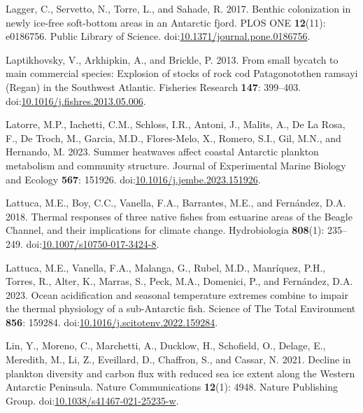 \documentclass[
]{article}
\newlength{\cslhangindent}
\newenvironment{CSLReferences}[2] %
 {\begin{list}{}{%
  \setlength{\itemindent}{0pt}
  \setlength{\leftmargin}{0pt}
  \setlength{\parsep}{0pt}
  \ifodd #1
   \setlength{\leftmargin}{\cslhangindent}
   \setlength{\itemindent}{-1\cslhangindent}
  \fi
  \setlength{\itemsep}{#2\baselineskip}}}
 {\end{list}}
\begin{document}
\begin{CSLReferences}{1}{0}
Lagger, C., Servetto, N., Torre, L., and Sahade, R. 2017. Benthic
colonization in newly ice-free soft-bottom areas in an {Antarctic}
fjord. PLOS ONE \textbf{12}(11): e0186756. Public Library of Science.
doi:\href{https://doi.org/10.1371/journal.pone.0186756}{10.1371/journal.pone.0186756}.

Laptikhovsky, V., Arkhipkin, A., and Brickle, P. 2013. From small
bycatch to main commercial species: {Explosion} of stocks of rock cod
{Patagonotothen} ramsayi ({Regan}) in the {Southwest Atlantic}.
Fisheries Research \textbf{147}: 399--403.
doi:\href{https://doi.org/10.1016/j.fishres.2013.05.006}{10.1016/j.fishres.2013.05.006}.

Latorre, M.P., Iachetti, C.M., Schloss, I.R., Antoni, J., Malits, A., De
La Rosa, F., De Troch, M., Garcia, M.D., Flores-Melo, X., Romero, S.I.,
Gil, M.N., and Hernando, M. 2023. Summer heatwaves affect coastal
{Antarctic} plankton metabolism and community structure. Journal of
Experimental Marine Biology and Ecology \textbf{567}: 151926.
doi:\href{https://doi.org/10.1016/j.jembe.2023.151926}{10.1016/j.jembe.2023.151926}.

Lattuca, M.E., Boy, C.C., Vanella, F.A., Barrantes, M.E., and Fernández,
D.A. 2018. Thermal responses of three native fishes from estuarine areas
of the {Beagle Channel}, and their implications for climate change.
Hydrobiologia \textbf{808}(1): 235--249.
doi:\href{https://doi.org/10.1007/s10750-017-3424-8}{10.1007/s10750-017-3424-8}.

Lattuca, M.E., Vanella, F.A., Malanga, G., Rubel, M.D., Manríquez, P.H.,
Torres, R., Alter, K., Marras, S., Peck, M.A., Domenici, P., and
Fernández, D.A. 2023. Ocean acidification and seasonal temperature
extremes combine to impair the thermal physiology of a sub-{Antarctic}
fish. Science of The Total Environment \textbf{856}: 159284.
doi:\href{https://doi.org/10.1016/j.scitotenv.2022.159284}{10.1016/j.scitotenv.2022.159284}.

Lin, Y., Moreno, C., Marchetti, A., Ducklow, H., Schofield, O., Delage,
E., Meredith, M., Li, Z., Eveillard, D., Chaffron, S., and Cassar, N.
2021. Decline in plankton diversity and carbon flux with reduced sea ice
extent along the {Western Antarctic Peninsula}. Nature Communications
\textbf{12}(1): 4948. Nature Publishing Group.
doi:\href{https://doi.org/10.1038/s41467-021-25235-w}{10.1038/s41467-021-25235-w}.


\end{CSLReferences}
\end{document}
